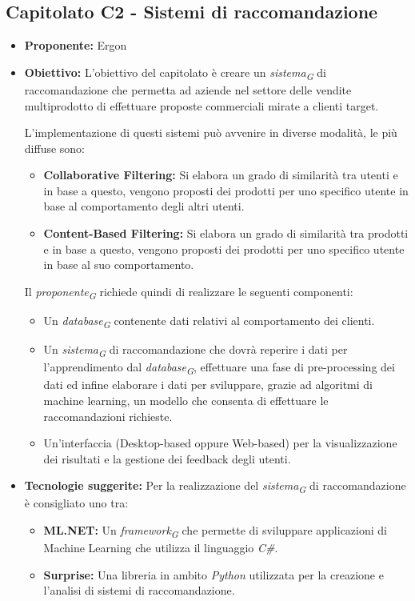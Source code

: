 \documentclass{article}
\begin{document}

\subsection{\textbf{Capitolato C2} - Sistemi di raccomandazione}
\begin{itemize}
    \item[] \textbf{Proponente:} Ergon
    
    \item[] \textbf{Obiettivo:} L’obiettivo del capitolato è creare un \textit{sistema}\textsubscript{\textit{G}} di raccomandazione che permetta ad aziende nel settore delle vendite multiprodotto di effettuare proposte commerciali mirate a clienti target.

    L’implementazione di questi sistemi può avvenire in diverse modalità, le più diffuse sono:
    \begin{itemize}
        \item \textbf{Collaborative Filtering:} Si elabora un grado di similarità tra utenti e in base a questo, vengono proposti dei prodotti per uno specifico utente in base al comportamento degli altri utenti.
        \item \textbf{Content-Based Filtering:} Si elabora un grado di similarità tra prodotti e in base a questo, vengono proposti dei prodotti per uno specifico utente in base al suo comportamento.
    \end{itemize}
    Il \textit{proponente}\textsubscript{\textit{G}} richiede quindi di realizzare le seguenti componenti:
    \begin{itemize}
        \item Un \textit{database}\textsubscript{\textit{G}} contenente dati relativi al comportamento dei clienti.
        \item Un \textit{sistema}\textsubscript{\textit{G}} di raccomandazione che dovrà reperire i dati per l’apprendimento dal \textit{database}\textsubscript{\textit{G}}, effettuare una fase di pre-processing dei dati ed infine elaborare i dati per sviluppare, grazie ad algoritmi di machine learning, un modello che consenta di effettuare le raccomandazioni richieste.
        \item Un’interfaccia (Desktop-based oppure Web-based) per la visualizzazione dei risultati e la gestione dei feedback degli utenti.
    \end{itemize}
    
    \item[] \textbf{Tecnologie suggerite:} Per la realizzazione del \textit{sistema}\textsubscript{\textit{G}} di raccomandazione è consigliato uno tra:
    \begin{itemize}
        \item \textbf{ML.NET:} Un \textit{framework}\textsubscript{\textit{G}} che permette di sviluppare applicazioni di Machine Learning che utilizza il linguaggio \textit{C\#}.
        \item \textbf{Surprise:} Una libreria in ambito \textit{Python} utilizzata per la creazione e l’analisi di sistemi di raccomandazione.
    \end{itemize}


\end{itemize}
\end{document}

